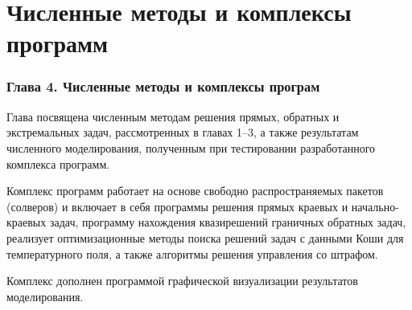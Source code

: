 \section{Численные методы и комплексы программ}\label{sec:prog}
\begin{frame}
    \frametitle{Глава 4. Численные методы и комплексы програм}
    Глава посвящена численным методам решения прямых, обратных и экстремальных задач,
    рассмотренных в главах 1–3, а также результатам численного
    моделирования, полученным при тестировании разработанного комплекса программ.

    Комплекс программ работает на основе свободно распространяемых
    пакетов (солверов) и включает в себя программы решения прямых краевых
    и начально-краевых задач, программу нахождения квазирешений граничных
    обратных задач, реализует оптимизационные методы поиска решений задач с
    данными Коши для температурного поля, а также алгоритмы решения управления со штрафом.

    Комплекс дополнен программой графической визуализации результатов моделирования.
\end{frame}

